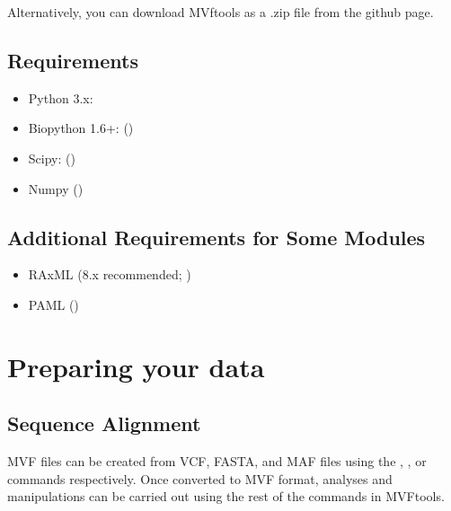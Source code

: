 \documentclass[letterpaper,11pt,english]{sphinxmanual}
\begin{document}
Alternatively, you can download MVftools as a .zip file from the github page.


\subsection{Requirements}
\label{\detokenize{intro:requirements}}\begin{itemize}
\item {} 
Python 3.x: 

\item {} 
Biopython 1.6+: ()

\item {} 
Scipy: ()

\item {} 
Numpy ()

\end{itemize}


\subsection{Additional Requirements for Some Modules}
\label{\detokenize{intro:additional-requirements-for-some-modules}}\begin{itemize}
\item {} 
RAxML (8.x recommended; )

\item {} 
PAML ()

\end{itemize}


\section{Preparing your data}
\label{\detokenize{intro:preparing-your-data}}

\subsection{Sequence Alignment}
\label{\detokenize{intro:sequence-alignment}}
MVF files can be created from VCF, FASTA, and MAF files using the , , or  commands respectively.  Once converted to MVF format, analyses and manipulations can be carried out using the rest of the commands in MVFtools.
\end{document}
